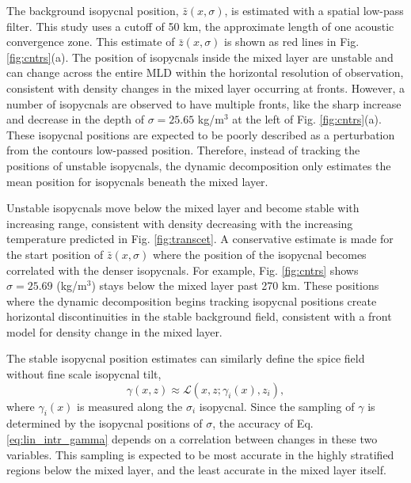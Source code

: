 \documentclass[preprint,NumberedRefs]{JASA}
\begin{document}
The background isopycnal position, $\bar{z}(x, \sigma)$, is estimated with a spatial low-pass filter. This study uses a cutoff of 50 km, the approximate length of one acoustic convergence zone\cite{jensen2011computational}. This estimate of $\bar{z}(x, \sigma)$ is shown as red lines in Fig. \ref{fig:cntrs}(a). The position of isopycnals inside the mixed layer are unstable and can change across the entire MLD within the horizontal resolution of observation, consistent with density changes in the mixed layer occurring at fronts. However, a number of isopycnals are observed to have multiple fronts, like the sharp increase and decrease in the depth of $\sigma=25.65$ kg/m$^3$ at the left of Fig. \ref{fig:cntrs}(a). These isopycnal positions are expected to be poorly described as a perturbation from the contours low-passed position. Therefore, instead of tracking the positions of unstable isopycnals, the dynamic decomposition only estimates the mean position for isopycnals beneath the mixed layer.

Unstable isopycnals move below the mixed layer and become stable with increasing range, consistent with density decreasing with the increasing temperature predicted in Fig. \ref{fig:transcet}. A conservative estimate is made for the start position of $\bar{z}(x, \sigma)$ where the position of the isopycnal becomes correlated with the denser isopycnals. For example, Fig. \ref{fig:cntrs} shows $\sigma=25.69$ (kg/m$^3$) stays below the mixed layer past 270 km. These positions where the dynamic decomposition begins tracking isopycnal positions create horizontal discontinuities in the stable background field, consistent with a front model for density change in the mixed layer.

The stable isopycnal position estimates can similarly define the spice field without fine scale isopycnal tilt,
\begin{equation}
    \gamma(x, z)\approx\mathcal{L}(x, z; \gamma_i(x), z_i),
    \label{eq:lin_intr_gamma}
\end{equation}
where $\gamma_i(x)$ is measured along the $\sigma_i$ isopycnal. Since the sampling of $\gamma$ is determined by the isopycnal positions of $\sigma$, the accuracy of Eq. \eqref{eq:lin_intr_gamma} depends on a correlation between changes in these two variables. This sampling is expected to be most accurate in the highly stratified regions below the mixed layer, and the least accurate in the mixed layer itself.
\end{document}
